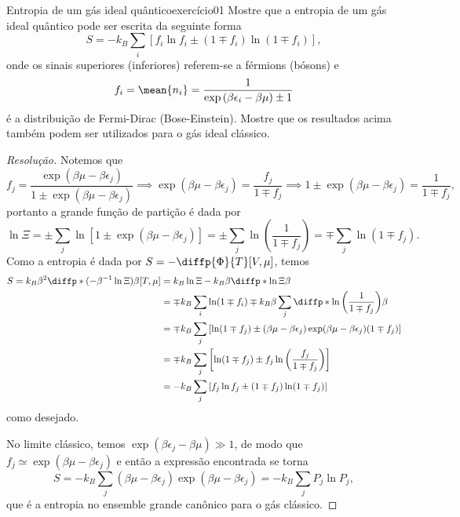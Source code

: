 \begin{exercício}{Entropia de um gás ideal quântico}{exercício01}
    Mostre que a entropia de um gás ideal quântico pode ser escrita da seguinte forma
    \begin{equation*}
        S = - k_B \sum_{i} \left[f_i \ln f_i \pm (1 \mp f_i)\ln(1 \mp f_i)\right],
    \end{equation*}
    onde os sinais superiores (inferiores) referem-se a férmions (bósons) e
    \begin{equation*}
        f_i = \mean{n_i} = \frac1{\exp\left(\beta \epsilon_i - \beta \mu\right) \pm 1}
    \end{equation*}
    é a distribuição de Fermi-Dirac (Bose-Einstein). Mostre que os resultados acima também podem ser utilizados para o gás ideal clássico.
\end{exercício}
\begin{proof}[Resolução]
    Notemos que
    \begin{equation*}
        f_j = \frac{\exp(\beta \mu - \beta \epsilon_j)}{1 \pm \exp(\beta \mu - \beta \epsilon_j)} \implies \exp(\beta \mu - \beta \epsilon_j) = \frac{f_j}{1 \mp f_j} \implies 1 \pm \exp(\beta \mu - \beta \epsilon_j) = \frac{1}{1 \mp f_j},
    \end{equation*}
    portanto a grande função de partição é dada por
    \begin{equation*}
        \ln{\Xi} = \pm \sum_j \ln[1 \pm \exp(\beta \mu - \beta \epsilon_j)] = \pm \sum_j \ln\left(\frac{1}{1 \mp f_j}\right) = \mp \sum_j \ln(1 \mp f_j).
    \end{equation*}
    Como a entropia é dada por \(S = -\diffp{\Phi}{T}[V,\mu]\), temos
    \begin{align*}
        S = k_B \beta^2 \diffp*{(-\beta^{-1} \ln\Xi)}{\beta}[T,\mu]
          &= k_B \ln\Xi - k_B \beta \diffp*{\ln{\Xi}}{\beta} \\
          &= \mp k_B  \sum_i \ln(1 \mp f_i) \mp k_B \beta \sum_{j}\diffp*{\ln\left(\frac{1}{1 \mp f_j}\right)}{\beta}\\
          &= \mp k_B \sum_j\left[ \ln(1 \mp f_j) \pm (\beta\mu - \beta \epsilon_j) \exp(\beta \mu - \beta \epsilon_j) (1 \mp f_j) \right]\\
          &= \mp k_B \sum_j\left[\ln(1\mp f_j) \pm f_j \ln\left(\frac{f_j}{1 \mp f_j}\right)\right]\\
          &= -k_B\sum_j\left[f_j \ln f_j \pm (1 \mp f_j)\ln(1 \mp f_j) \right]
    \end{align*}
    como desejado.

    No limite clássico, temos \(\exp(\beta \epsilon_j - \beta \mu) \gg 1\), de modo que \(f_j \simeq \exp(\beta \mu - \beta \epsilon_j)\) e então a expressão encontrada se torna
    \begin{equation*}
        S = -k_B \sum_j (\beta \mu - \beta \epsilon_j) \exp(\beta \mu -\beta \epsilon_j) = -k_B \sum_j P_j \ln P_j,
    \end{equation*}
    que é a entropia no ensemble grande canônico para o gás clássico.
\end{proof}
